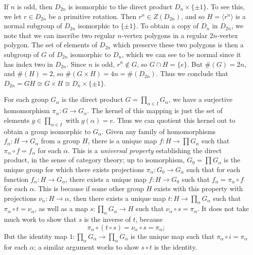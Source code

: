 \begin{example}
    If $n$ is odd, then $D_{2n}$ is isomorphic to the direct product $D_n \times \{ \pm 1 \}$. To see this, we let $r \in D_{2n}$ be a primitive rotation. Then $r^n \in Z(D_{2n})$, and so $H = \langle r^n \rangle$ is a normal subgroup of $D_{2n}$ isomorphic to $\{ \pm 1 \}$. To obtain a copy of $D_n$ in $D_{2n}$, we note that we can inscribe two regular $n$-vertex polygons in a regular $2n$-vertex polygon. The set of elements of $D_{2n}$ which preserve these two polygons is then a subgroup of $G$ of $D_{2n}$ isomorphic to $D_n$, which we can see to be normal since it has index two in $D_{2n}$. Since $n$ is odd, $r^n \not \in G$, so $G \cap H = \{ e \}$. But $\#(G) = 2n$, and $\#(H) = 2$, so $\#(G \times H) = 4n = \#(D_{2n})$. Thus we conclude that $D_{2n} = GH \cong G \times H \cong D_n \times \{ \pm 1 \}$.
\end{example}

For each group $G_\alpha$ is the direct product $G = \prod_{\alpha \in I} G_\alpha$, we have a surjective homomorphism $\pi_\alpha: G \to G_\alpha$. The kernel of this mapping is just the set of elements $g \in \prod_{\alpha \in I}$ with $g(\alpha) = e$. Thus we can quotient this kernel out to obtain a group isomorphic to $G_\alpha$. Given any family of homomorphisms $f_\alpha: H \to G_\alpha$ from a group $H$, there is a unique map $f: H \to \prod G_\alpha$ such that $\pi_\alpha \circ f = f_\alpha$ for each $\alpha$. This is a \emph{universal property} establishing the direct product, in the sense of category theory; up to isomorphism, $G_0 = \prod G_\alpha$ is the unique group for which there exists projections $\pi_\alpha: G_0 \to G_\alpha$ such that for each function $f_\alpha: H \to G_\alpha$, there exists a unique map $f: H \to G_0$ such that $f_\alpha = \pi_\alpha \circ f$ for each $\alpha$. This is because if some other group $H$ exists with this property with projections $\nu_\alpha: H \to \alpha$, then there exists a unique map $t: H \to \prod_\alpha G_\alpha$ such that $\pi_\alpha \circ t = \nu_\alpha$, as well as a map $s: \prod_\alpha G_\alpha \to H$ such that $\nu_\alpha \circ s = \pi_\alpha$. It does not take much work to show that $s$ is the inverse of $t$, because
%
\[ \pi_\alpha \circ (t \circ s) = \nu_\alpha \circ s = \pi_\alpha; \]
%
But the identity map $1: \prod_\alpha G_\alpha \to \prod_\alpha G_\alpha$ is the unique map such that $\pi_\alpha \circ i = \pi_\alpha$ for each $\alpha$; a similar argument works to show $s \circ t$ is the identity.

